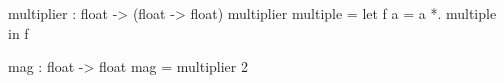 \begin{minipage}{3in}
  \begin{AVerb}[gobble=4,numbers=left]
    multiplier : float -> (float -> float)
    multiplier multiple = 
      let f a = a *. multiple \label{lang_fig2_ml_fun}
      in f

    mag : float -> float
    mag = multiplier 2 \label{lang_fig2_ml_mag}
  \end{AVerb}
\end{minipage}
